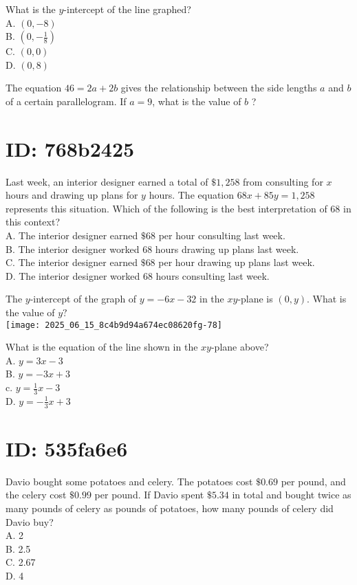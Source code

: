What is the $y$-intercept of the line graphed?\\
A. $(0,-8)$\\
B. $\left(0,-\frac{1}{8}\right)$\\
C. $(0,0)$\\
D. $(0,8)$

The equation $46=2 a+2 b$ gives the relationship between the side lengths $a$ and $b$ of a certain parallelogram. If $a=9$, what is the value of $b$ ?

\section*{ID: 768b2425}
Last week, an interior designer earned a total of $\$ 1,258$ from consulting for $x$ hours and drawing up plans for $y$ hours. The equation $68 x+85 y=1,258$ represents this situation. Which of the following is the best interpretation of 68 in this context?\\
A. The interior designer earned $\$ 68$ per hour consulting last week.\\
B. The interior designer worked 68 hours drawing up plans last week.\\
C. The interior designer earned $\$ 68$ per hour drawing up plans last week.\\
D. The interior designer worked 68 hours consulting last week.

The $y$-intercept of the graph of $y=-6 x-32$ in the $x y$-plane is $(0, y)$. What is the value of $y ?$\\
\texttt{[image: 2025\_06\_15\_8c4b9d94a674ec08620fg-78]}

What is the equation of the line shown in the $x y$-plane above?\\
A. $y=3 x-3$\\
B. $y=-3 x+3$\\
c. $y=\frac{1}{3} x-3$\\
D. $y=-\frac{1}{3} x+3$

\section*{ID: 535fa6e6}
Davio bought some potatoes and celery. The potatoes cost $\$ 0.69$ per pound, and the celery cost $\$ 0.99$ per pound. If Davio spent $\$ 5.34$ in total and bought twice as many pounds of celery as pounds of potatoes, how many pounds of celery did Davio buy?\\
A. 2\\
B. 2.5\\
C. 2.67\\
D. 4


